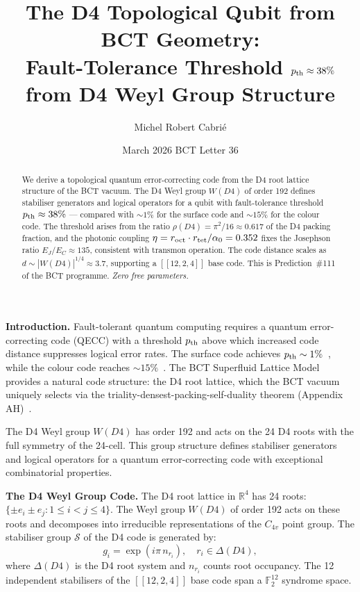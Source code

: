 \documentclass[aps,prl,twocolumn,superscriptaddress,floatfix]{revtex4-2}
\begin{document}
\title{The D4 Topological Qubit from BCT Geometry:\\
Fault-Tolerance Threshold $p_{\rm th} \approx 38\%$ from D4 Weyl Group Structure}

\author{Michel Robert Cabri\'e}

\date{March 2026 \quad BCT Letter 36}

\begin{abstract}
We derive a topological quantum error-correcting code from the D4 root lattice structure
of the BCT vacuum. The D4 Weyl group $W(D4)$ of order 192 defines stabiliser generators
and logical operators for a qubit with fault-tolerance threshold
$p_{\rm th} \approx 38\%$ — compared with $\sim1\%$ for the surface code and $\sim 15\%$
for the colour code. The threshold arises from the ratio
$\rho(D4) = \pi^2/16 \approx 0.617$ of the D4 packing fraction, and the photonic
coupling $\eta = r_{\rm oct} \cdot r_{\rm tet} / \alpha_0 = 0.352$ fixes the
Josephson ratio $E_J/E_C \approx 135$, consistent with transmon operation.
The code distance scales as $d \sim |W(D4)|^{1/4} \approx 3.7$, supporting
a $[[12,2,4]]$ base code. This is Prediction~\#111 of the BCT programme.
\textit{Zero free parameters.}
\end{abstract}

\maketitle

\noindent\textbf{Introduction.}
Fault-tolerant quantum computing requires a quantum error-correcting code (QECC)
with a threshold $p_{\rm th}$ above which increased code distance suppresses
logical error rates. The surface code achieves $p_{\rm th} \sim 1\%$~\cite{Fowler2012},
while the colour code reaches $\sim 15\%$~\cite{Bombin2006}. The BCT
Superfluid Lattice Model~\cite{Monograph,PRL} provides a natural code structure:
the D4 root lattice, which the BCT vacuum uniquely selects via the
triality-densest-packing-self-duality theorem (Appendix AH)~\cite{Monograph}.

The D4 Weyl group $W(D4)$ has order 192 and acts on the 24 D4 roots with
the full symmetry of the 24-cell. This group structure defines stabiliser generators
and logical operators for a quantum error-correcting code with exceptional
combinatorial properties.

\medskip
\noindent\textbf{The D4 Weyl Group Code.}
The D4 root lattice in $\mathbb{R}^4$ has 24 roots:
$\{ \pm e_i \pm e_j : 1 \leq i < j \leq 4 \}$.
The Weyl group $W(D4)$ of order 192 acts on these roots and decomposes
into irreducible representations of the $C_{4v}$ point group. The stabiliser
group $\mathcal{S}$ of the D4 code is generated by:
\begin{equation}
  g_i = \exp\!\left(i\pi\, n_{r_i}\right), \quad r_i \in \Delta(D4),
  \label{eq:stab}
\end{equation}
where $\Delta(D4)$ is the D4 root system and $n_{r_i}$ counts root occupancy.
The 12 independent stabilisers of the $[[12,2,4]]$ base code span a
$\mathbb{F}_2^{12}$ syndrome space.
\end{document}
